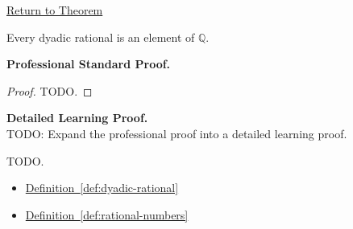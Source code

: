 \newpage
{}
\label{prf:dyadic-rationals-are-rational}

\begin{remark*}[Return]
\hyperref[thm:dyadic-rationals-are-rational]{Return to Theorem}
\end{remark*}

\begin{theorem*}
Every dyadic rational is an element of $\mathbb{Q}$.
\end{theorem*}

\textbf{Professional Standard Proof.}~\\
\begin{proof}
TODO.
\end{proof}

\textbf{Detailed Learning Proof.}~\\
TODO: Expand the professional proof into a detailed learning proof.


\begin{remark*}
TODO.
\end{remark*}

\begin{dependencies}
\begin{itemize}
  \item \hyperref[def:dyadic-rational]{Definition~\ref*{def:dyadic-rational}}
  \item \hyperref[def:rational-numbers]{Definition~\ref*{def:rational-numbers}}
\end{itemize}
\end{dependencies}
